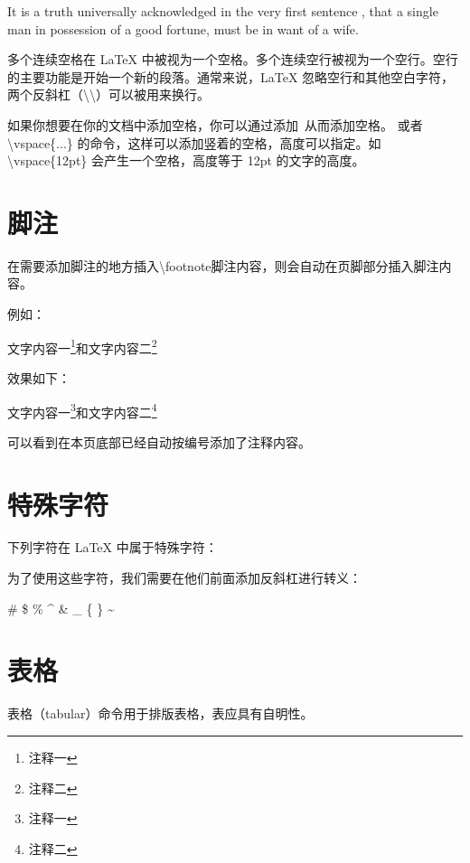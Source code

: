 It is a truth universally acknowledged %
in the very first sentence , that a single man in possession of a good fortune,
must be in want of a wife.

多个连续空格在 LaTeX 中被视为一个空格。多个连续空行被视为一个空行。空行的主要功能是开始一个新的段落。通常来说，LaTeX 忽略空行和其他空白字符，两个反斜杠（\textbackslash\textbackslash）可以被用来换行。

如果你想要在你的文档中添加空格，你可以通过添加~从而添加空格。
或者 \textbackslash vspace\{...\} 的命令，这样可以添加竖着的空格，高度可以指定。如 \textbackslash vspace\{12pt\} 会产生一个空格，高度等于 12pt 的文字的高度。

\section{脚注}

在需要添加脚注的地方插入\textbackslash footnote{脚注内容}，则会自动在页脚部分插入脚注内容。

例如：

\begin{python}
文字内容一\footnote{注释一}和文字内容二\footnote{注释二}
\end{python}

效果如下：

文字内容一\footnote{注释一}和文字内容二\footnote{注释二}

可以看到在本页底部已经自动按编号添加了注释内容。

\section{特殊字符}

下列字符在 LaTeX 中属于特殊字符：

\begin{python}
#
$
%
^
&
_
{
}
~
\
\end{python}

为了使用这些字符，我们需要在他们前面添加反斜杠进行转义：

\begin{python}
\#
\$
\%
\^{}
\&
\_
\{
\}
\~{}
\end{python}

\section{表格}

表格（tabular）命令用于排版表格，表应具有自明性。

